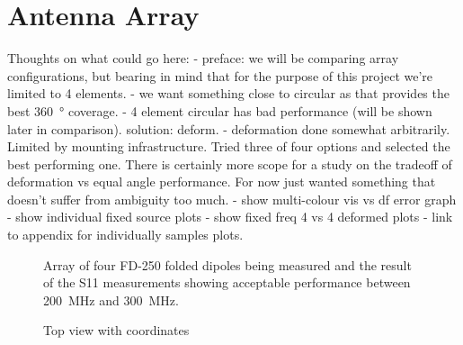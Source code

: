 \section{Antenna Array}

Thoughts on what could go here:
- preface: we will be comparing array configurations, but bearing in mind that for the purpose of this project we're limited to 4 elements.
- we want something close to circular as that provides the best \SI{360}{\degree} coverage.
- 4 element circular has bad performance (will be shown later in comparison). solution: deform.
- deformation done somewhat arbitrarily. Limited by mounting infrastructure. Tried three of four options and selected the best performing one. There is certainly more scope for a study on the tradeoff of deformation vs equal angle performance. For now just wanted something that doesn't suffer from ambiguity too much.
- show multi-colour vis vs df error graph
- show individual fixed source plots
- show fixed freq 4 vs 4 deformed plots
- link to appendix for individually samples plots.

\begin{landscape}
  \thispagestyle{empty}
  \begin{figure}
    \centering
    \caption{Array of four FD-250 folded dipoles being measured and the result of the S11 measurements showing acceptable performance between \SI{200}{\mega\hertz} and \SI{300}{\mega\hertz}.}
  \end{figure}
\end{landscape}
\thispagestyle{empty}
\begin{landscape}
  \begin{figure}
    \centering
    \caption{Top view with coordinates}
  \end{figure}
\end{landscape}
